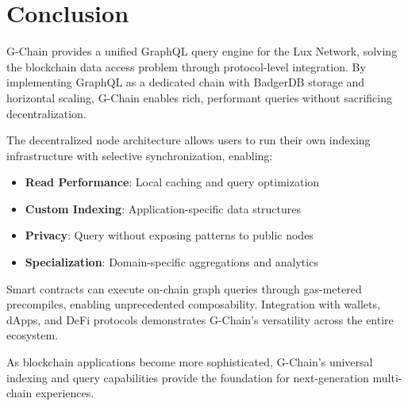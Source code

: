 \section{Conclusion}


G-Chain provides a unified GraphQL query engine for the Lux Network, solving the blockchain data access problem through protocol-level integration. By implementing GraphQL as a dedicated chain with BadgerDB storage and horizontal scaling, G-Chain enables rich, performant queries without sacrificing decentralization.

The decentralized node architecture allows users to run their own indexing infrastructure with selective synchronization, enabling:
\begin{itemize}
\item \textbf{Read Performance}: Local caching and query optimization
\item \textbf{Custom Indexing}: Application-specific data structures
\item \textbf{Privacy}: Query without exposing patterns to public nodes
\item \textbf{Specialization}: Domain-specific aggregations and analytics
\end{itemize}

Smart contracts can execute on-chain graph queries through gas-metered precompiles, enabling unprecedented composability. Integration with wallets, dApps, and DeFi protocols demonstrates G-Chain's versatility across the entire ecosystem.

As blockchain applications become more sophisticated, G-Chain's universal indexing and query capabilities provide the foundation for next-generation multi-chain experiences.

